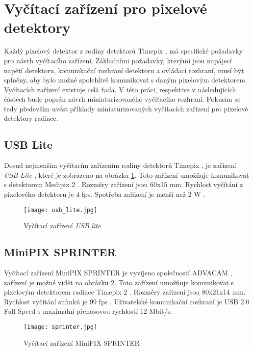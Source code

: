 \section{Vyčítací zařízení pro pixelové detektory}
\label{Vycitaci zarizeni}
Každý pixelový detektor z rodiny detektorů Timepix \cite{Llopart}, má specifické požadavky pro návrh vyčítacího zařízení. Základními požadavky, kterými jsou napájecí napětí detektoru, komunikační rozhraní detektoru a ovládací rozhraní, musí být splněny, aby bylo možné spolehlivě komunikovat s daným pixelovým detektorem. Vyčítacích zařízení existuje celá řada. V této práci, respektive v následujících částech bude popsán návrh miniaturizovaného vyčítacího rozhraní. Pokusím se tedy především uvést příklady miniaturizovaných vyčítacích zařízení pro pixelové detektory radiace.

\subsection{USB Lite}
Dosud nejmenším vyčítacím zařízením rodiny detektorů Timepix \cite{Llopart}, je zařízení \textit{USB Lite} \cite{usb_lite}, které je zobrazeno na obrázku \ref{fig:usb_lite}. Toto zařízení umožňuje komunikovat s detektorem Medipix 2 \cite{Medpix2}. Rozměry zařízení jsou 60x15 mm. Rychlost vyčítání z pixelového detektoru je 4 fps. Spotřeba zařízení je menší než 2 W \cite{usb_lite}.
 \begin{figure}[h!]
	\centering
	\captionsetup{justification=centering}
	\texttt{[image: usb\_lite.jpg]}
	\caption{Vyčítací zařízení \textit{USB lite}} 
	\label{fig:usb_lite}
\end{figure}	

\subsection{MiniPIX SPRINTER}
Vyčítací zařízení MiniPIX SPRINTER je vyvíjeno společností ADVACAM \cite{Advacam}, zařízení je možné vidět na obrázku \ref{fig:sprinter}. Toto zařízení umožňuje komunikovat s pixelovým detektorem radiace Timepix 2 \cite{tpx2_manual}. Rozměry zařízení jsou 80x21x14 mm. Rychlost vyčítání snímků je 99 fps \cite{Advacam}. Uživatelské komunikační rozhraní je USB 2.0 Full Speed s maximální přenosovou rychlostí 12 Mbit/s.
\begin{figure}[h!]
	\centering
	\captionsetup{justification=centering}
	\texttt{[image: sprinter.jpg]}
	\caption{Vyčítací zařízení MiniPIX SPRINTER} 
	\label{fig:sprinter}
\end{figure}	

